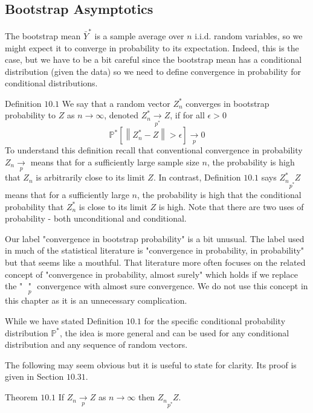 \documentclass[10pt]{article}
\begin{document}
\subsection{Bootstrap Asymptotics}
The bootstrap mean $\bar{Y}^{*}$ is a sample average over $n$ i.i.d. random variables, so we might expect it to converge in probability to its expectation. Indeed, this is the case, but we have to be a bit careful since the bootstrap mean has a conditional distribution (given the data) so we need to define convergence in probability for conditional distributions.

Definition $10.1$ We say that a random vector $Z_{n}^{*}$ converges in bootstrap probability to $Z$ as $n \rightarrow \infty$, denoted $Z_{n}^{*} \underset{p^{*}}{\longrightarrow} Z$, if for all $\epsilon>0$
$$
\mathbb{P}^{*}\left[\left\|Z_{n}^{*}-Z\right\|>\epsilon\right] \underset{p}{\longrightarrow} 0
$$
To understand this definition recall that conventional convergence in probability $Z_{n} \underset{p}{\longrightarrow}$ means that for a sufficiently large sample size $n$, the probability is high that $Z_{n}$ is arbitrarily close to its limit $Z$. In contrast, Definition $10.1$ says $Z_{n}^{*} \underset{p^{*}}{ } Z$ means that for a sufficiently large $n$, the probability is high that the conditional probability that $Z_{n}^{*}$ is close to its limit $Z$ is high. Note that there are two uses of probability - both unconditional and conditional.

Our label "convergence in bootstrap probability" is a bit unusual. The label used in much of the statistical literature is "convergence in probability, in probability" but that seems like a mouthful. That literature more often focuses on the related concept of "convergence in probability, almost surely" which holds if we replace the " $\underset{p}{\text { " }}$ convergence with almost sure convergence. We do not use this concept in this chapter as it is an unnecessary complication.

While we have stated Definition $10.1$ for the specific conditional probability distribution $\mathbb{P}^{*}$, the idea is more general and can be used for any conditional distribution and any sequence of random vectors.

The following may seem obvious but it is useful to state for clarity. Its proof is given in Section $10.31 .$

Theorem $10.1$ If $Z_{n} \underset{p}{\longrightarrow} Z$ as $n \rightarrow \infty$ then $Z_{n} \underset{p^{*}}{ } Z$.
\end{document}

